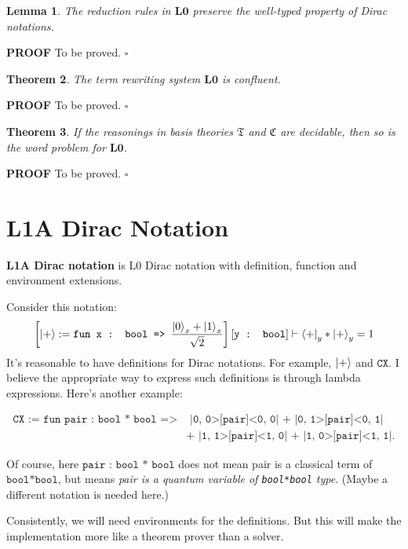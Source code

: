 \documentclass{article}
\newtheorem{theorem}{Theorem}[section]
\newtheorem{lemma}[theorem]{Lemma}
\newenvironment{proof}{\textbf{PROOF}}{\hfill $\square$ \vspace{1em}}
\begin{document}
\begin{lemma}
  The reduction rules in $\textbf{L0}$ preserve the well-typed property of Dirac notations.
\end{lemma}
\begin{proof}
  To be proved.
\end{proof}

\begin{theorem}
  The term rewriting system $\textbf{L0}$ is confluent.
\end{theorem}
\begin{proof}
  To be proved.
\end{proof}

\begin{theorem}
  If the reasonings in basis theories $\mathfrak{T}$ and $\mathfrak{C}$ are decidable, then so is the word problem for $\textbf{L0}$.
\end{theorem}
\begin{proof}
  To be proved.
\end{proof}


\section{L1A Dirac Notation}
\textbf{L1A Dirac notation} is L0 Dirac notation with definition, function and environment extensions.

Consider this notation:
$$
\left [\ket{+} := \texttt{fun x : bool => }\frac{\ket{0}_x + \ket{1}_x}{\sqrt{2}} \right ][\texttt{y : bool}] \vdash \bra{+}_y * \ket{+}_y = 1
$$
It's reasonable to have definitions for Dirac notations. For example, $\ket{+}$ and $\texttt{CX}$. I believe the appropriate way to express such definitions is through lambda expressions. Here's another example:

\begin{align*}
\texttt{CX := fun pair : bool * bool =>} & \texttt{ |0, 0>[pair]<0, 0| + |0, 1>[pair]<0, 1|}\\
& \texttt{+ |1, 1>[pair]<1, 0| + |1, 0>[pair]<1, 1|.}
\end{align*}

Of course, here $\texttt{pair : bool * bool}$ does not mean pair is a classical term of $\texttt{bool*bool}$, but means \textit{pair is a quantum variable of \texttt{bool*bool} type}. (Maybe a different notation is needed here.)

Consistently, we will need environments for the definitions. But this will make the implementation more like a theorem prover than a solver.
\end{document}
